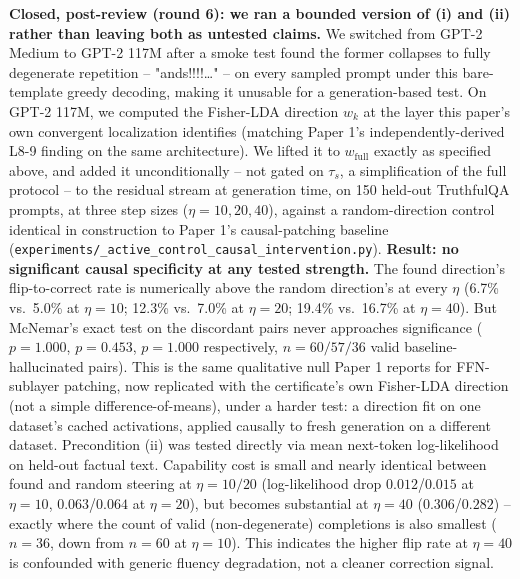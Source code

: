 \documentclass[10pt,twocolumn]{article}
\begin{document}
\textbf{Closed, post-review (round 6): we ran a bounded version of (i)
and (ii) rather than leaving both as untested claims.} We switched from
GPT-2 Medium to GPT-2 117M after a smoke test found the former
collapses to fully degenerate repetition -- "ands!!!!\ldots" -- on
every sampled prompt under this bare-template greedy decoding, making
it unusable for a generation-based test. On GPT-2 117M, we computed
the Fisher-LDA direction $w_k$ at the layer this paper's own
convergent localization identifies (matching Paper 1's
independently-derived L8-9 finding on the same architecture). We
lifted it to $w_{\text{full}}$ exactly as specified above, and added
it unconditionally -- not gated on $\tau_s$, a simplification of the
full protocol -- to the residual stream at generation time, on 150
held-out TruthfulQA prompts, at three step sizes ($\eta=10,20,40$),
against a random-direction control identical in construction to
Paper 1's causal-patching baseline
(\texttt{experiments/\_\allowbreak active\_\allowbreak control\_\allowbreak causal\_\allowbreak intervention.py}).
\textbf{Result: no significant causal specificity at any tested
strength.} The found direction's flip-to-correct rate is numerically
above the random direction's at every $\eta$ (6.7\% vs.\ 5.0\% at
$\eta=10$; 12.3\% vs.\ 7.0\% at $\eta=20$; 19.4\% vs.\ 16.7\% at
$\eta=40$). But McNemar's exact test on the discordant pairs never
approaches significance ($p=1.000$, $p=0.453$, $p=1.000$ respectively,
$n=60/57/36$ valid baseline-hallucinated pairs). This is the same
qualitative null Paper 1 reports for FFN-sublayer patching, now
replicated with the certificate's own Fisher-LDA direction (not a
simple difference-of-means), under a harder test: a direction fit on
one dataset's cached activations, applied causally to fresh generation
on a different dataset. Precondition (ii) was tested directly via mean
next-token log-likelihood on held-out factual text. Capability cost is
small and nearly identical between found and random steering at
$\eta=10/20$ (log-likelihood drop $0.012$/$0.015$ at $\eta=10$,
$0.063$/$0.064$ at $\eta=20$), but becomes substantial at $\eta=40$
($0.306$/$0.282$) -- exactly where the count of valid (non-degenerate)
completions is also smallest ($n=36$, down from $n=60$ at $\eta=10$).
This indicates the higher flip rate at $\eta=40$ is confounded with
generic fluency degradation, not a cleaner correction signal.
\end{document}
